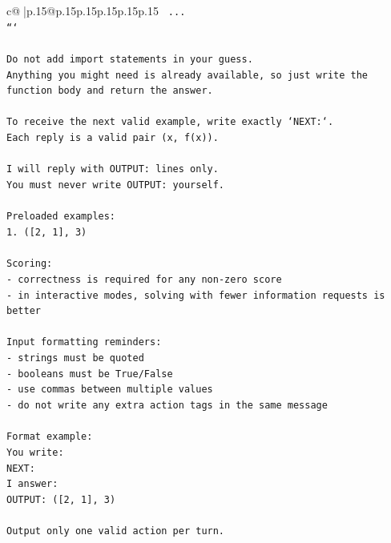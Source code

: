 \documentclass{article}
\begin{document}
{\begin{supertabular}{c@{$\;$}|p{.15\linewidth}@{}p{.15\linewidth}p{.15\linewidth}p{.15\linewidth}p{.15\linewidth}p{.15\linewidth}}
{{{\texttt{    ...} \\
\texttt{```} \\
\\ 
\texttt{Do not add import statements in your guess.} \\
\texttt{Anything you might need is already available, so just write the function body and return the answer.} \\
\\ 
\texttt{To receive the next valid example, write exactly `NEXT:`.} \\
\texttt{Each reply is a valid pair (x, f(x)).} \\
\\ 
\texttt{I will reply with OUTPUT: lines only.} \\
\texttt{You must never write OUTPUT: yourself.} \\
\\ 
\texttt{Preloaded examples:} \\
\texttt{1. ({[}2, 1{]}, 3)} \\
\\ 
\texttt{Scoring:} \\
\texttt{{-} correctness is required for any non{-}zero score} \\
\texttt{{-} in interactive modes, solving with fewer information requests is better} \\
\\ 
\texttt{Input formatting reminders:} \\
\texttt{{-} strings must be quoted} \\
\texttt{{-} booleans must be True/False} \\
\texttt{{-} use commas between multiple values} \\
\texttt{{-} do not write any extra action tags in the same message} \\
\\ 
\texttt{Format example:} \\
\texttt{You write:} \\
\texttt{NEXT:} \\
\texttt{I answer:} \\
\texttt{OUTPUT: ({[}2, 1{]}, 3)} \\
\\ 
\texttt{Output only one valid action per turn.} \\
            }
        }
    }
     \\ \\


\end{supertabular}}
\end{document}
